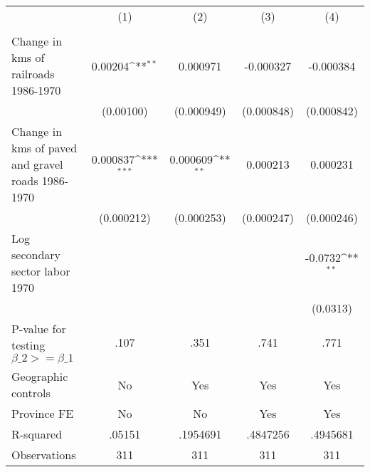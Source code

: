{
\def\sym#1{\ifmmode^{#1}\else\(^{#1}\)\fi}
\begin{tabular}{l*{4}{c}}
\hline\hline
                &\multicolumn{1}{c}{(1)}&\multicolumn{1}{c}{(2)}&\multicolumn{1}{c}{(3)}&\multicolumn{1}{c}{(4)}\\
                &\multicolumn{1}{c}{}&\multicolumn{1}{c}{}&\multicolumn{1}{c}{}&\multicolumn{1}{c}{}\\
\hline
Change in kms of railroads 1986-1970&  0.00204\sym{**} & 0.000971         &-0.000327         &-0.000384         \\
                &(0.00100)         &(0.000949)         &(0.000848)         &(0.000842)         \\
[1em]
Change in kms of paved and gravel roads 1986-1970& 0.000837\sym{***}& 0.000609\sym{**} & 0.000213         & 0.000231         \\
                &(0.000212)         &(0.000253)         &(0.000247)         &(0.000246)         \\
[1em]
Log secondary sector labor 1970&                  &                  &                  &  -0.0732\sym{**} \\
                &                  &                  &                  & (0.0313)         \\
\hline
P-value for testing $\beta\_{2} >= \beta\_{1}$&     .107         &     .351         &     .741         &     .771         \\
Geographic controls&       No         &      Yes         &      Yes         &      Yes         \\
Province FE     &       No         &       No         &      Yes         &      Yes         \\
R-squared       &   .05151         & .1954691         & .4847256         & .4945681         \\
Observations    &      311         &      311         &      311         &      311         \\
\hline\hline
\end{tabular}
}
